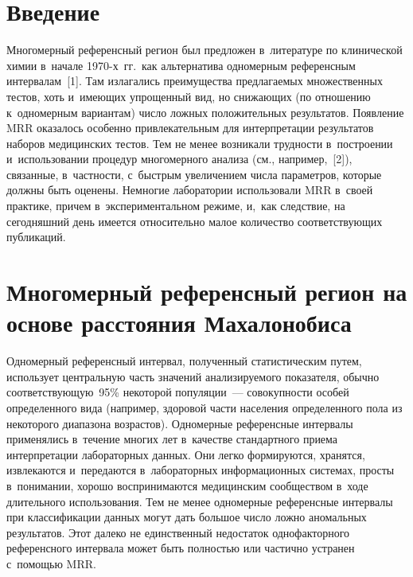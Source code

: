 \begin{multicols}{2}

\label{st\stat}

\section{Введение}

     Многомерный референсный регион 
был предложен в~литературе по клинической химии в~начале 1970-х~гг.\ как 
альтернатива одномерным референсным интервалам~[1]. Там излагались 
преимущества предлагаемых множественных тестов, хоть и~имеющих 
упрощенный вид, но снижающих (по отношению к~одномерным вариантам) 
число ложных положительных результатов. Появление MRR оказалось 
особенно привлекательным для интерпретации результатов наборов 
медицинских тестов. Тем не менее возникали трудности в~построении 
и~использовании процедур многомерного анализа (см., например,~[2]), 
связанные, в~частности, с~быстрым увеличением числа параметров, которые 
должны быть оценены. Немногие лаборатории использовали MRR в~своей 
практике, причем в~экспериментальном режиме, и,~как следствие, на 
сегодняшний день имеется относительно малое количество соответствующих 
публикаций. 

\vspace*{-6pt}

\section{Многомерный референсный регион на основе расстояния Махалонобиса}

\vspace*{-2pt}

     Одномерный референсный интервал, полученный статистическим путем, 
использует центральную часть значений анализируемого показателя, обычно 
соответствующую~95\% некоторой популяции~--- совокупности особей 
определенного вида (например, здоровой части населения определенного пола 
из некоторого диапазона возрастов). Одномерные референсные интервалы 
применялись в~течение многих лет в~качестве стандартного приема 
интерпретации лабораторных данных. Они легко формируются, хранятся, 
извлекаются и~передаются в~лабораторных информационных системах, просты 
в~понимании, хорошо воспринимаются медицинским сообществом в~ходе 
длительного использования. Тем не менее одномерные референсные интервалы 
при классификации данных могут дать большое число ложно аномальных 
результатов. Этот далеко не единственный недостаток однофакторного 
референсного интервала может быть полностью или частично устранен 
с~помощью MRR.
     

\end{multicols}
